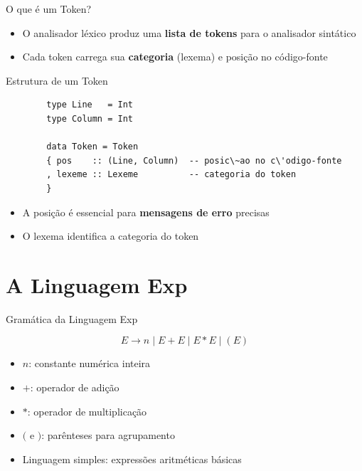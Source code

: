 \begin{frame}{O que é um Token?}

    \begin{itemize}

        \item
        O analisador léxico produz uma \textbf{lista de tokens} para o
        analisador sintático
        \item
        Cada token carrega sua \textbf{categoria} (lexema) e posição no
        código-fonte
    \end{itemize}
\end{frame}

\begin{frame}[fragile]{Estrutura de um Token}

    \begin{lstlisting}
        type Line   = Int
        type Column = Int

        data Token = Token
        { pos    :: (Line, Column)  -- posic\~ao no c\'odigo-fonte
        , lexeme :: Lexeme          -- categoria do token
        }
    \end{lstlisting}

    \begin{itemize}

        \item
        A posição é essencial para \textbf{mensagens de erro} precisas
        \item
        O lexema identifica a categoria do token
    \end{itemize}
\end{frame}


\section{A Linguagem Exp}\label{a-linguagem-exp}

\begin{frame}{Gramática da Linguagem Exp}

    \[E \to n \mid E + E \mid E * E \mid (E)\]

    \begin{itemize}

        \item
        \(n\): constante numérica inteira
        \item
        \(+\): operador de adição
        \item
        \(*\): operador de multiplicação
        \item
        \((\) e \()\): parênteses para agrupamento
        \item
        Linguagem simples: expressões aritméticas básicas
    \end{itemize}
\end{frame}

